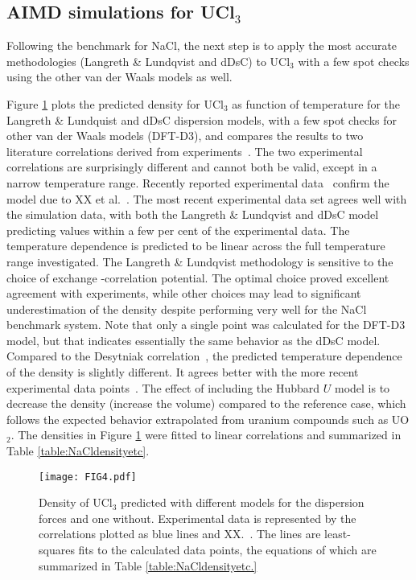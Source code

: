 \documentclass[preprint,3p,10pt,twocolumn,number,sort&compress]{elsarticle}
\begin{document}
\subsection{AIMD simulations for UCl$_3$}
Following the benchmark for NaCl, the next step is to apply the most accurate methodologies (Langreth \& Lundqvist and dDsC) to UCl$_3$ with a few spot checks using the other van der Waals models as well. 

Figure \ref{fig:UCl3density} plots the predicted density for UCl$_3$ as function of temperature for the Langreth \& Lundquist and dDsC dispersion models, with a few spot checks for other van der Waals models (DFT-D3), and compares the results to two literature correlations derived from experiments~\cite{}. The two experimental correlations are surprisingly different and cannot both be valid, except in a narrow temperature range. Recently reported experimental data~\cite{} confirm the model due to XX et al.~\cite{}. The most recent experimental data set agrees well with the simulation data, with both the Langreth \& Lundqvist and dDsC model predicting values within a few per cent of the experimental data. The temperature dependence is predicted to be linear across the full temperature range investigated. The Langreth \& Lundqvist methodology is sensitive to the choice of exchange -correlation potential. The optimal choice proved excellent agreement with experiments, while other choices may lead to significant underestimation of the density despite performing very well for the NaCl benchmark system. Note that only a single point was calculated for the DFT-D3 model, but that indicates essentially the same behavior as the dDsC model.  Compared to the Desytniak correlation~\cite{},  the predicted temperature dependence of the density is slightly different. It agrees better with the more recent experimental data points~\cite{XX}. The effect of including the Hubbard $U$  model is to decrease the density (increase the volume) compared to the reference case, which follows the expected behavior extrapolated from uranium compounds such as UO$_2$. The densities in Figure \ref{fig:UCl3density} were fitted to linear correlations and summarized in Table \ref{table:NaCldensityetc}.

\begin{figure}[htb]
\centering
\texttt{[image: FIG4.pdf]}
\caption{Density of UCl$_3$ predicted with different models for the dispersion forces and one without. Experimental data is represented by the correlations plotted as blue lines and XX.~\cite{}. The lines are least-squares fits to the calculated data points, the equations of which are summarized in Table \ref{table:NaCldensityetc.}} 
\label{fig:UCl3density}
\end{figure}
 
\end{document}
